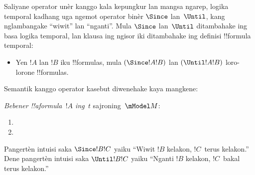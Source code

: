 \documentclass[../../../include/open-logic-section]{subfiles}
\begin{document}


Saliyane operator unèr kanggo kala kepungkur lan mangsa ngarep,
logika temporal kadhang uga ngemot operator binèr $\Since $ lan~$\Until$,
kang nglambangake ``wiwit'' lan ``nganti''. Mula $\Since $ lan~$\Until$
ditambahake ing basa logika temporal, lan klausa ing ngisor iki
ditambahake ing definisi !!{formula} temporal:

\begin{itemize}
\item[] Yen $!A$ lan $!B$ iku !!{formula}s, mula $(\Since  !A !B)$ lan
  $(\Until !A !B)$ loro-lorone !!{formula}s.
\end{itemize}

Semantik kanggo operator kasebut diwenehake kaya mangkene:

\begin{defn}
  \emph{Bebener !!a{formula}~$!A$ ing~$t$} sajroning~$\mModel M$:
  \begin{enumerate}
  \item{} 
   \item{} 
  \end{enumerate} 
\end{defn}

Pangertèn intuisi saka $\Since  !B !C$ yaiku ``Wiwit $!B$ kelakon,
$!C$~terus kelakon.'' Dene pangertèn intuisi saka $\Until !B !C$
yaiku ``Nganti $!B$ kelakon, $!C$~bakal terus kelakon.''
\end{document}
